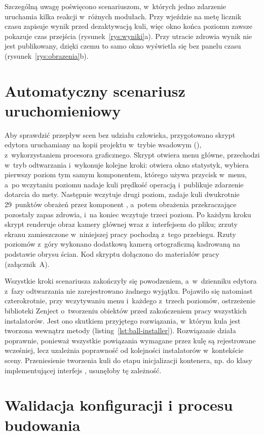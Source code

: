 Szczególną uwagę poświęcono scenariuszom, w~których jedno zdarzenie uruchamia kilka
reakcji w~różnych modułach. Przy wjeździe na metę licznik czasu zapisuje wynik przed
dezaktywacją kuli, więc okno końca poziomu zawsze pokazuje czas przejścia
(rysunek~\ref{rys:wyniki}a). Przy utracie zdrowia wynik nie jest publikowany, dzięki
czemu to samo okno wyświetla się bez panelu czasu (rysunek~\ref{rys:obrazenia}b).

\section{Automatyczny scenariusz uruchomieniowy}

Aby sprawdzić przepływ scen bez udziału człowieka, przygotowano skrypt edytora
uruchamiany na kopii projektu w~trybie wsadowym (), z~wykorzystaniem
procesora graficznego. Skrypt otwiera menu główne, przechodzi w~tryb odtwarzania
i~wykonuje kolejne kroki: otwiera okno statystyk, wybiera pierwszy poziom tym samym
komponentem, którego używa przycisk w~menu, a~po wczytaniu poziomu nadaje kuli prędkość
operacją  i~publikuje zdarzenie dotarcia do mety. Następnie wczytuje drugi
poziom, zadaje kuli dwukrotnie 29~punktów obrażeń przez komponent ,
a~potem obrażenia przekraczające pozostały zapas zdrowia, i~na koniec wczytuje trzeci
poziom. Po każdym kroku skrypt renderuje obraz kamery głównej wraz z~interfejsem do pliku;
zrzuty ekranu zamieszczone w~niniejszej pracy pochodzą z~tego przebiegu. Rzuty poziomów
z~góry wykonano dodatkową kamerą ortograficzną kadrowaną na podstawie obrysu ścian.
Kod skryptu dołączono do materiałów pracy (załącznik~A).

Wszystkie kroki scenariusza zakończyły się powodzeniem, a~w~dzienniku edytora z~fazy
odtwarzania nie zarejestrowano żadnego wyjątku. Pojawiło się natomiast czterokrotnie,
przy wczytywaniu menu i~każdego z~trzech poziomów, ostrzeżenie biblioteki Zenject
o~tworzeniu obiektów przed zakończeniem pracy wszystkich instalatorów. Jest ono skutkiem
przyjętego rozwiązania, w~którym kula jest tworzona wewnątrz metody
 (listing~\ref{lst:ball-installer}). Rozwiązanie działa poprawnie,
ponieważ wszystkie powiązania wymagane przez kulę są rejestrowane wcześniej, lecz
uzależnia poprawność od kolejności instalatorów w~kontekście sceny. Przeniesienie
tworzenia kuli do etapu inicjalizacji kontenera, np. do klasy implementującej interfejs
, usunęłoby tę zależność.

\section{Walidacja konfiguracji i procesu budowania}

